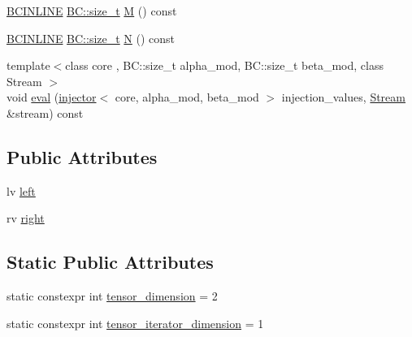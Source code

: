 \begin{DoxyCompactItemize}
\item 
\hyperlink{BlackCat__Common_8h_a6699e8b0449da5c0fafb878e59c1d4b1}{B\+C\+I\+N\+L\+I\+NE} \hyperlink{namespaceBC_a6007cbc4eeec401a037b558910a56173}{B\+C\+::size\+\_\+t} \hyperlink{structBC_1_1tensors_1_1exprs_1_1Binary__Expression_3_01oper_1_1ger_3_01System__Tag_01_4_00_01lv_00_01rv_01_4_a8bb5d9782e997461c186ec4ee222830c}{M} () const 
\item 
\hyperlink{BlackCat__Common_8h_a6699e8b0449da5c0fafb878e59c1d4b1}{B\+C\+I\+N\+L\+I\+NE} \hyperlink{namespaceBC_a6007cbc4eeec401a037b558910a56173}{B\+C\+::size\+\_\+t} \hyperlink{structBC_1_1tensors_1_1exprs_1_1Binary__Expression_3_01oper_1_1ger_3_01System__Tag_01_4_00_01lv_00_01rv_01_4_a0f22d72b767231320427b61f1066260e}{N} () const 
\item 
{\footnotesize template$<$class core , B\+C\+::size\+\_\+t alpha\+\_\+mod, B\+C\+::size\+\_\+t beta\+\_\+mod, class Stream $>$ }\\void \hyperlink{structBC_1_1tensors_1_1exprs_1_1Binary__Expression_3_01oper_1_1ger_3_01System__Tag_01_4_00_01lv_00_01rv_01_4_a491494ab236df60f5e7e3038a09dd707}{eval} (\hyperlink{structBC_1_1tensors_1_1exprs_1_1injector}{injector}$<$ core, alpha\+\_\+mod, beta\+\_\+mod $>$ injection\+\_\+values, \hyperlink{namespaceBC_abc64a63cd29a22d102a68f478dfd588d}{Stream} \&stream) const 
\end{DoxyCompactItemize}
\subsection*{Public Attributes}
\begin{DoxyCompactItemize}
\item 
lv \hyperlink{structBC_1_1tensors_1_1exprs_1_1Binary__Expression_3_01oper_1_1ger_3_01System__Tag_01_4_00_01lv_00_01rv_01_4_aed3bb00335897aaaaac661d106de8130}{left}
\item 
rv \hyperlink{structBC_1_1tensors_1_1exprs_1_1Binary__Expression_3_01oper_1_1ger_3_01System__Tag_01_4_00_01lv_00_01rv_01_4_a5236c349912f20832a0744a503a9077e}{right}
\end{DoxyCompactItemize}
\subsection*{Static Public Attributes}
\begin{DoxyCompactItemize}
\item 
static constexpr int \hyperlink{structBC_1_1tensors_1_1exprs_1_1Binary__Expression_3_01oper_1_1ger_3_01System__Tag_01_4_00_01lv_00_01rv_01_4_a0d83f56593eb3cf084010eb6b6593ce1}{tensor\+\_\+dimension} = 2
\item 
static constexpr int \hyperlink{structBC_1_1tensors_1_1exprs_1_1Binary__Expression_3_01oper_1_1ger_3_01System__Tag_01_4_00_01lv_00_01rv_01_4_a91e2694919251d815e3cd16b47698c3e}{tensor\+\_\+iterator\+\_\+dimension} = 1
\end{DoxyCompactItemize}


